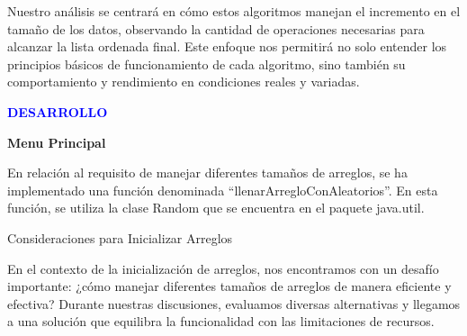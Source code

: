 \documentclass[12pt]{article}
\begin{document}
\par\vspace{0.4cm}
Nuestro análisis se centrará en cómo estos algoritmos manejan el incremento en el tamaño de los datos, observando la cantidad de operaciones necesarias para alcanzar la lista ordenada final. Este enfoque nos permitirá no solo entender los principios básicos de funcionamiento de cada algoritmo, sino también su comportamiento y rendimiento en condiciones reales y variadas.
\par\vspace{1.5cm}
\textcolor{blue}{\textbf{DESARROLLO}}
\par\vspace{0.4cm}
\textcolor[rgb]{0.13, 0.55, 0.13}{\textbf{Menu Principal}}
\par\vspace{0.4cm}
En relación al requisito de manejar diferentes tamaños de arreglos, se ha implementado una función denominada “llenarArregloConAleatorios”. En esta función, se utiliza la clase Random que se encuentra en el paquete java.util.
\par\vspace{0.4cm}
Consideraciones para Inicializar Arreglos
\par\vspace{0.4cm}
En el contexto de la inicialización de arreglos, nos encontramos con un desafío importante: ¿cómo manejar diferentes tamaños de arreglos de manera eficiente y efectiva? Durante nuestras discusiones, evaluamos diversas alternativas y llegamos a una solución que equilibra la funcionalidad con las limitaciones de recursos.
\par\vspace{0.4cm}
\end{document}
